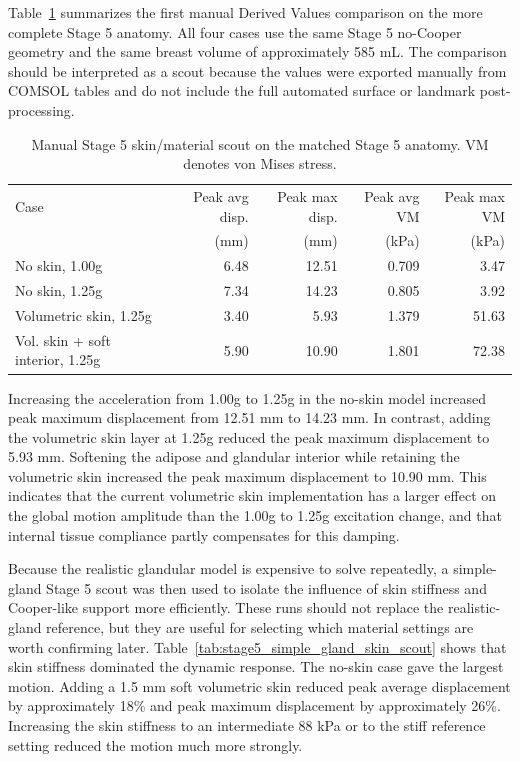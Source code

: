 Table~\ref{tab:stage5_skin_scout} summarizes the first manual Derived Values comparison on the more complete Stage 5 anatomy. All four cases use the same Stage 5 no-Cooper geometry and the same breast volume of approximately 585 mL. The comparison should be interpreted as a scout because the values were exported manually from COMSOL tables and do not include the full automated surface or landmark post-processing.

\begin{table}[H]
\centering
\small
\caption{Manual Stage 5 skin/material scout on the matched Stage 5 anatomy. VM denotes von Mises stress.}
\label{tab:stage5_skin_scout}
\begin{tabular}{lrrrr}
\toprule
Case & Peak avg disp. & Peak max disp. & Peak avg VM & Peak max VM \\
 & (mm) & (mm) & (kPa) & (kPa) \\
\midrule
No skin, 1.00g & 6.48 & 12.51 & 0.709 & 3.47 \\
No skin, 1.25g & 7.34 & 14.23 & 0.805 & 3.92 \\
Volumetric skin, 1.25g & 3.40 & 5.93 & 1.379 & 51.63 \\
Vol. skin + soft interior, 1.25g & 5.90 & 10.90 & 1.801 & 72.38 \\
\bottomrule
\end{tabular}
\end{table}

Increasing the acceleration from 1.00g to 1.25g in the no-skin model increased peak maximum displacement from 12.51 mm to 14.23 mm. In contrast, adding the volumetric skin layer at 1.25g reduced the peak maximum displacement to 5.93 mm. Softening the adipose and glandular interior while retaining the volumetric skin increased the peak maximum displacement to 10.90 mm. This indicates that the current volumetric skin implementation has a larger effect on the global motion amplitude than the 1.00g to 1.25g excitation change, and that internal tissue compliance partly compensates for this damping.

Because the realistic glandular model is expensive to solve repeatedly, a simple-gland Stage 5 scout was then used to isolate the influence of skin stiffness and Cooper-like support more efficiently. These runs should not replace the realistic-gland reference, but they are useful for selecting which material settings are worth confirming later. Table~\ref{tab:stage5_simple_gland_skin_scout} shows that skin stiffness dominated the dynamic response. The no-skin case gave the largest motion. Adding a 1.5 mm soft volumetric skin reduced peak average displacement by approximately 18\% and peak maximum displacement by approximately 26\%. Increasing the skin stiffness to an intermediate 88 kPa or to the stiff reference setting reduced the motion much more strongly.


